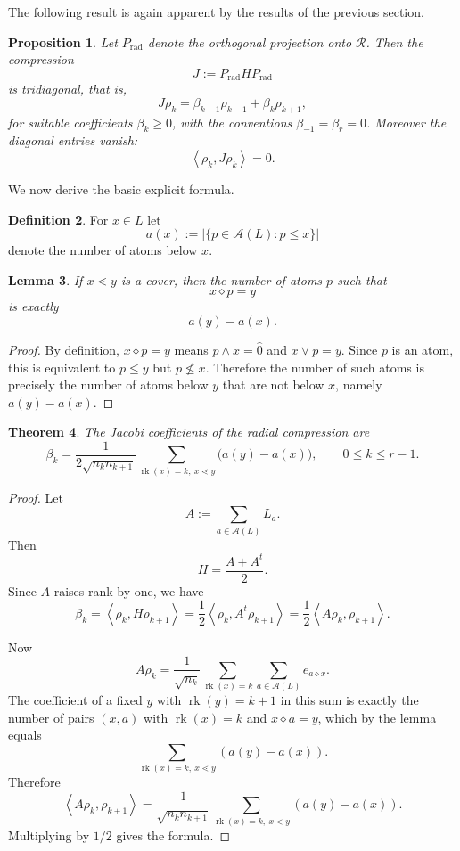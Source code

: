 \documentclass[11pt]{amsart}
\newtheorem{thm}{Theorem}[section]
\newtheorem{lem}[thm]{Lemma}
\newtheorem{prop}[thm]{Proposition}
\theoremstyle{definition}
\newtheorem{defn}[thm]{Definition}
\DeclareMathOperator{\rk}{rk}
\newcommand{\cc}{\mathcal}
\newcommand{\ip}[2]{\left\langle #1, #2 \right\rangle}
\newcommand{\At}{\mathcal{A}}
\newcommand{\zero}{\hat{0}}
\newcommand{\rad}{\mathrm{rad}}
\begin{document}
The following result is again apparent by the results of the previous section.

\begin{prop}
Let $P_{\rad}$ denote the orthogonal projection onto $\cc R$.  Then the compression
\[
J:=P_{\rad}HP_{\rad}
\]
is tridiagonal, that is, 
\[
J\rho_k=\beta_{k-1}\rho_{k-1}+\beta_k\rho_{k+1},
\]
for suitable coefficients $\beta_k\ge 0$, with the conventions $\beta_{-1}=\beta_r=0$.
Moreover the diagonal entries vanish:
\[
\ip{\rho_k}{J\rho_k}=0.
\]
\end{prop}




We now derive the basic explicit formula.

\begin{defn}
For $x\in L$ let
\[
a(x):=|\{p\in \At(L):p\le x\}|
\]
denote the number of atoms below $x$.
\end{defn}

\begin{lem}
If $x\lessdot y$ is a cover, then the number of atoms $p$ such that
\[
x\diamond p=y
\]
is exactly
\[
a(y)-a(x).
\]
\end{lem}

\begin{proof}
    By definition, $x\diamond p=y$ means $p\wedge x=\zero$ and $x\vee p=y$.  Since $p$ is an atom, this is equivalent to $p\le y$ but $p\nleq x$.  Therefore the number of such atoms is precisely the number of atoms below $y$ that are not below $x$, namely $a(y)-a(x)$.
\end{proof}

\begin{thm}\label{thm:beta-formula}
The Jacobi coefficients of the radial compression are
\[
\beta_k=
\frac{1}{2\sqrt{n_k n_{k+1}}}
\sum_{\rk(x)=k,\ x\lessdot y}
\bigl(a(y)-a(x)\bigr),
\qquad 0\le k\le r-1.
\]
\end{thm}

\begin{proof}
Let
\[
A:=\sum_{a\in \At(L)} L_a.
\]
Then
\[
H=\frac{A+A^t}{2}.
\]
Since $A$ raises rank by one, we have
\[
\beta_k=\ip{\rho_k}{H\rho_{k+1}}
=\frac12 \ip{\rho_k}{A^t\rho_{k+1}}
=\frac12 \ip{A\rho_k}{\rho_{k+1}}.
\]

Now
\[
A\rho_k=
\frac{1}{\sqrt{n_k}}\sum_{\rk(x)=k}\sum_{a\in \At(L)} e_{a\diamond x}.
\]
The coefficient of a fixed $y$ with $\rk(y) =k+1$ in this sum is exactly the number of pairs $(x,a)$ with
$\rk(x)=k$ and $x\diamond a=y$, which by the lemma equals
\[
\sum_{\rk(x)=k,\ x\lessdot y} (a(y)-a(x)).
\]
Therefore
\[
\ip{A\rho_k}{\rho_{k+1}}
=
\frac{1}{\sqrt{n_k n_{k+1}}}
\sum_{\rk(x)=k,\ x\lessdot y}
(a(y)-a(x)).
\]
Multiplying by $1/2$ gives the formula.
\end{proof}
\end{document}
